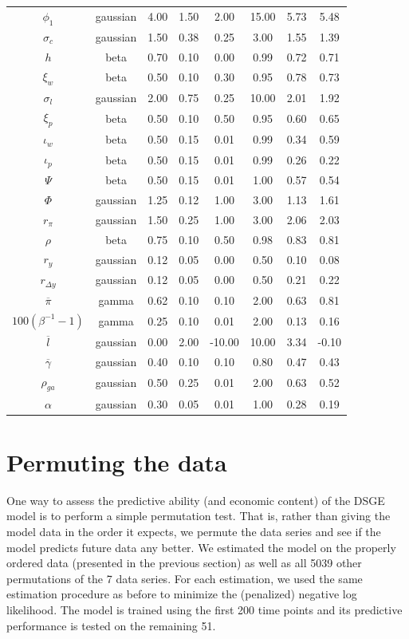 \documentclass[11pt]{article}
\begin{document}
\begin{table}[t]
\begin{tabular}{cccccccc}
$\phi_1$ & gaussian & 4.00 & 1.50 & 2.00 & 15.00 & 5.73 & 5.48\\
$\sigma_c$ & gaussian & 1.50 & 0.38 & 0.25 & 3.00 & 1.55 & 1.39\\
$h$ & beta & 0.70 & 0.10 & 0.00 & 0.99 & 0.72 & 0.71\\
$\xi_w$ & beta & 0.50 & 0.10 & 0.30 & 0.95 & 0.78 & 0.73\\
\addlinespace
$\sigma_l$ & gaussian & 2.00 & 0.75 & 0.25 & 10.00 & 2.01 & 1.92\\
$\xi_p$ & beta & 0.50 & 0.10 & 0.50 & 0.95 & 0.60 & 0.65\\
$\iota_w$ & beta & 0.50 & 0.15 & 0.01 & 0.99 & 0.34 & 0.59\\
$\iota_p$ & beta & 0.50 & 0.15 & 0.01 & 0.99 & 0.26 & 0.22\\
$\Psi$ & beta & 0.50 & 0.15 & 0.01 & 1.00 & 0.57 & 0.54\\
\addlinespace
$\Phi$ & gaussian & 1.25 & 0.12 & 1.00 & 3.00 & 1.13 & 1.61\\
$r_\pi$ & gaussian & 1.50 & 0.25 & 1.00 & 3.00 & 2.06 & 2.03\\
$\rho$ & beta & 0.75 & 0.10 & 0.50 & 0.98 & 0.83 & 0.81\\
$r_y$ & gaussian & 0.12 & 0.05 & 0.00 & 0.50 & 0.10 & 0.08\\
$r_{\Delta y}$ & gaussian & 0.12 & 0.05 & 0.00 & 0.50 & 0.21 & 0.22\\
\addlinespace
$\overline{\pi}$ & gamma & 0.62 & 0.10 & 0.10 & 2.00 & 0.63 & 0.81\\
$100(\beta^{-1} -1)$ & gamma & 0.25 & 0.10 & 0.01 & 2.00 & 0.13 & 0.16\\
$\overline{l}$ & gaussian & 0.00 & 2.00 & -10.00 & 10.00 & 3.34 & -0.10\\
$\overline{\gamma}$ & gaussian & 0.40 & 0.10 & 0.10 & 0.80 & 0.47 & 0.43\\
$\rho_{ga}$ & gaussian & 0.50 & 0.25 & 0.01 & 2.00 & 0.63 & 0.52\\
\addlinespace
$\alpha$ & gaussian & 0.30 & 0.05 & 0.01 & 1.00 & 0.28 & 0.19\\
\bottomrule
\end{tabular}
\end{table}

\section{Permuting the data}
\label{sec:permutation-summary}

One way to assess the predictive ability (and economic content) of the
\citet{SmetsWouters2007} DSGE model is to perform a simple permutation
test. That is, rather than giving the model data in the order it
expects, we permute the data series and see if the model predicts future
data any better. We estimated the model on the properly ordered data
(presented in the previous section) as well as all 5039 other
permutations of the 7 data series. For each estimation, we used the same
estimation procedure as before to minimize the (penalized) negative log
likelihood. The model is trained using the first 200 time points and its
predictive performance is tested on the remaining 51.
\end{document}
